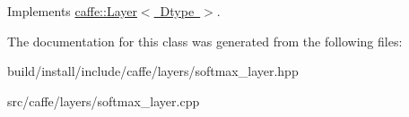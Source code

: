 Implements \mbox{\hyperlink{classcaffe_1_1_layer_a7fe981e8af8d93d587acf2a952be563d}{caffe\+::\+Layer$<$ Dtype $>$}}.



The documentation for this class was generated from the following files\+:\begin{DoxyCompactItemize}
\item 
build/install/include/caffe/layers/softmax\+\_\+layer.\+hpp\item 
src/caffe/layers/softmax\+\_\+layer.\+cpp\end{DoxyCompactItemize}
